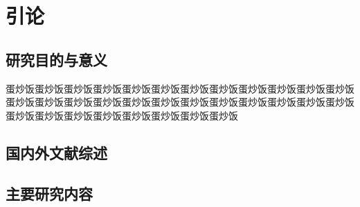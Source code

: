 \chapter*{引\hspace{1em}论}
\section{研究目的与意义}
蛋炒饭蛋炒饭蛋炒饭蛋炒饭蛋炒饭蛋炒饭蛋炒饭蛋炒饭蛋炒饭蛋炒饭蛋炒饭蛋炒饭蛋炒饭蛋炒饭蛋炒饭蛋炒饭蛋炒饭蛋炒饭蛋炒饭蛋炒饭蛋炒饭蛋炒饭蛋炒饭蛋炒饭蛋炒饭蛋炒饭蛋炒饭蛋炒饭蛋炒饭蛋炒饭蛋炒饭蛋炒饭
\section{国内外文献综述}
\section{主要研究内容}